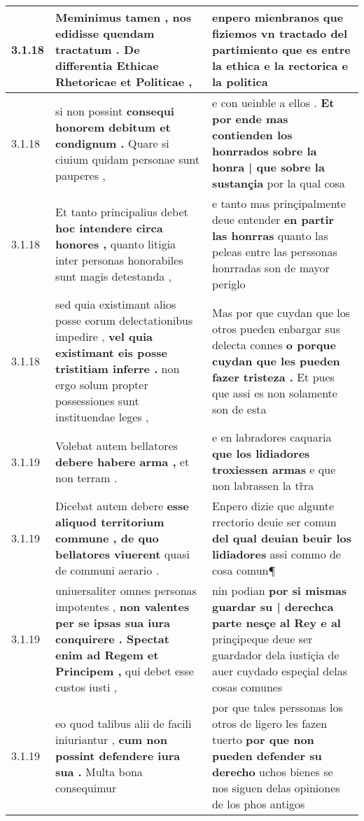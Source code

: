 \begin{tabular}{|p{1cm}|p{6.5cm}|p{6.5cm}|}
3.1.18 & Meminimus tamen , \textbf{ nos edidisse quendam tractatum . } De differentia Ethicae Rhetoricae et Politicae , & enpero mienbranos \textbf{ que fiziemos vn tractado del partimiento } que es entre la ethica e la rectorica e la politica \\\hline
3.1.18 & si non possint \textbf{ consequi honorem debitum et condignum . } Quare si ciuium quidam personae sunt pauperes , & e con ueinble a ellos . \textbf{ Et por ende mas contienden los honrrados sobre la honra | que sobre la sustançia } por la qual cosa \\\hline
3.1.18 & Et tanto principalius debet \textbf{ hoc intendere circa honores , } quanto litigia inter personas honorabiles sunt magis detestanda , & e tanto mas prinçipalmente deue entender \textbf{ en partir las honrras } quanto las peleas entre las perssonas honrradas son de mayor periglo \\\hline
3.1.18 & sed quia existimant alios posse eorum delectationibus impedire , \textbf{ vel quia existimant eis posse tristitiam inferre . } non ergo solum propter possessiones sunt instituendae leges , & Mas por que cuydan que los otros pueden enbargar sus delecta connes \textbf{ o porque cuydan que les pueden fazer tristeza . } Et pues que assi es non solamente son de esta \\\hline
3.1.19 & Volebat autem bellatores \textbf{ debere habere arma , } et non terram . & e en labradores caquaria \textbf{ que los lidiadores troxiessen armas } e que non labrassen la tr̃ra \\\hline
3.1.19 & Dicebat autem debere \textbf{ esse aliquod territorium commune , de quo bellatores viuerent } quasi de communi aerario . & Enpero dizie que algunte rrectorio deuie ser comun \textbf{ del qual deuian beuir los lidiadores } assi commo de cosa comun¶ \\\hline
3.1.19 & uniuersaliter omnes personas impotentes , \textbf{ non valentes per se ipsas sua iura conquirere . Spectat enim ad Regem et Principem , } qui debet esse custos iusti , & nin podian \textbf{ por si mismas guardar su | derechca parte nesçe al Rey e al } prinçipeque deue ser guardador dela iustiçia de auer cuydado espeçial delas cosas comunes \\\hline
3.1.19 & eo quod talibus alii de facili iniuriantur , \textbf{ cum non possint defendere iura sua . } Multa bona consequimur & por que tales perssonas los otros de ligero les fazen tuerto \textbf{ por que non pueden defender su derecho } uchos bienes se nos siguen delas opiniones de los phos antigos \\\hline

\end{tabular}
